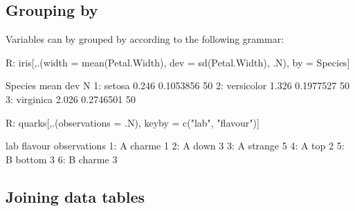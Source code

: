 \subsection{Grouping by}
Variables can by grouped by according to
the following grammar:
\begin{example}
R: iris[,.(width = mean(Petal.Width), dev = sd(Petal.Width), .N), 
        by = Species]
        
      Species  mean       dev  N
1:     setosa 0.246 0.1053856 50
2: versicolor 1.326 0.1977527 50
3:  virginica 2.026 0.2746501 50


R: quarks[,.(observations = .N), 
	keyby = c("lab", "flavour")]

    lab flavour observations
 1:   A  charme            1
 2:   A    down            3
 3:   A strange            5
 4:   A     top            2
 5:   B  bottom            3
 6:   B  charme            3
\end{example}

\subsection{Joining data tables}
